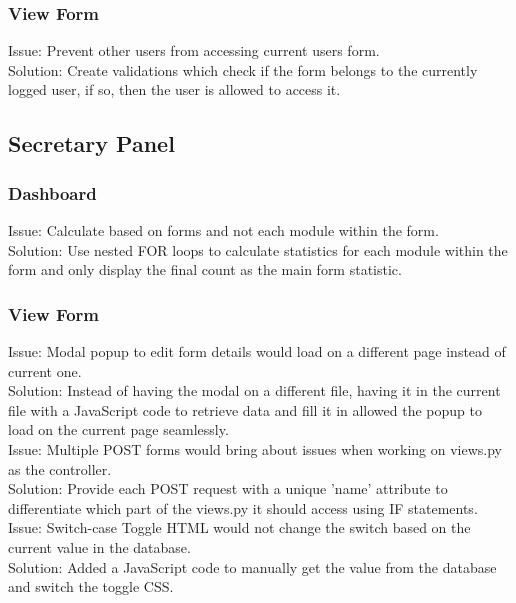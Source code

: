 \documentclass[../main.tex]{subfiles}
\begin{document}
\subsubsection{View Form}
Issue: Prevent other users from accessing current users form.                                                                   \\
Solution: Create validations which check if the form belongs to the currently logged user, if so, then the user is allowed to access it.                                                                               \\[2mm]


\subsection{Secretary Panel}

\subsubsection{Dashboard}
Issue: Calculate based on forms and not each module within the form.\\
Solution: Use nested FOR loops to calculate statistics for each module within the form and only display the final count as the main form statistic.                                                     \\[2mm]

\subsubsection{View Form}
Issue: Modal popup to edit form details would load on a different page instead of current one.\\
Solution: Instead of having the modal on a different file, having it in the current file with a JavaScript code to retrieve data and fill it in allowed the popup to load on the current page seamlessly.\\[2mm]

Issue: Multiple POST forms would bring about issues when working on views.py as the controller.\\
Solution: Provide each POST request with a unique 'name' attribute to differentiate which part of the views.py it should access using IF statements.\\[2mm]

Issue: Switch-case Toggle HTML would not change the switch based on the current value in the database.\\
Solution: Added a JavaScript code to manually get the value from the database and switch the toggle CSS.                                                                                                \\[2mm]
\end{document}
